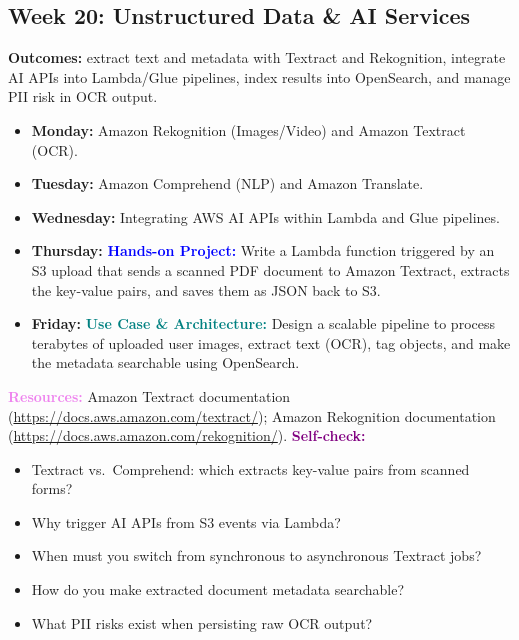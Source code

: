 \documentclass[11pt, a4paper]{article}
\newcommand{\project}[1]{\vspace{1mm}\noindent\textbf{\textcolor{blue}{Hands-on Project:}} #1}
\newcommand{\usecase}[1]{\vspace{1mm}\noindent\textbf{\textcolor{teal}{Use Case \& Architecture:}} #1}
\newcommand{\dayitem}[2]{\item \textbf{#1:} #2}
\newcommand{\resources}[1]{\vspace{1mm}\noindent\textbf{\textcolor{violet}{Resources:}} #1}
\newcommand{\selfcheck}[1]{\vspace{1mm}\noindent\textbf{\textcolor{purple}{Self-check:}} #1}
\begin{document}
\subsection*{Week 20: Unstructured Data \& AI Services}
\par\noindent\textbf{Outcomes:} extract text and metadata with Textract and Rekognition, integrate AI APIs into Lambda/Glue pipelines, index results into OpenSearch, and manage PII risk in OCR output.
\begin{itemize}[label=-]
    \dayitem{Monday}{Amazon Rekognition (Images/Video) and Amazon Textract (OCR).}
    \dayitem{Tuesday}{Amazon Comprehend (NLP) and Amazon Translate.}
    \dayitem{Wednesday}{Integrating AWS AI APIs within Lambda and Glue pipelines.}
    \dayitem{Thursday}{\project{Write a Lambda function triggered by an S3 upload that sends a scanned PDF document to Amazon Textract, extracts the key-value pairs, and saves them as JSON back to S3.}}
    \dayitem{Friday}{\usecase{Design a scalable pipeline to process terabytes of uploaded user images, extract text (OCR), tag objects, and make the metadata searchable using OpenSearch.}}
\end{itemize}
\resources{Amazon Textract documentation (\url{https://docs.aws.amazon.com/textract/}); Amazon Rekognition documentation (\url{https://docs.aws.amazon.com/rekognition/}).}
\selfcheck{\begin{itemize}[label=-, leftmargin=1.5em, itemsep=0pt]
    \item Textract vs.\ Comprehend: which extracts key-value pairs from scanned forms?
    \item Why trigger AI APIs from S3 events via Lambda?
    \item When must you switch from synchronous to asynchronous Textract jobs?
    \item How do you make extracted document metadata searchable?
    \item What PII risks exist when persisting raw OCR output?
\end{itemize}}
\end{document}

